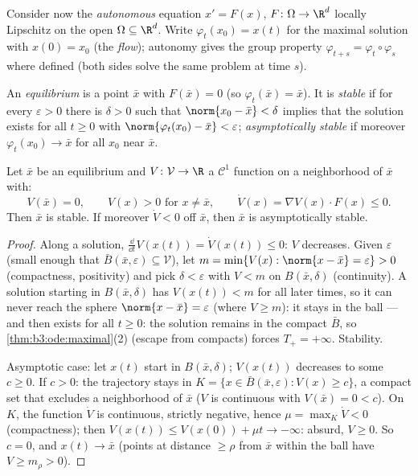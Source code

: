 Consider now the \emph{autonomous} equation $x' = F(x)$, $F
\colon \Omega \to \R^d$ locally Lipschitz on the open $\Omega
\subseteq \R^d$. Write $\varphi_t(x_0) = x(t)$ for the
maximal solution with $x(0) = x_0$ (the
\emph{flow}); autonomy gives
the group property $\varphi_{t+s} =
\varphi_t\circ\varphi_s$ where defined (both sides solve the
same problem at time $s$).

\begin{definition}\label{def:b3:ode:stability}
An \emph{equilibrium} is a point $\bar x$ with $F(\bar x) =
0$ (so $\varphi_t(\bar x) = \bar x$). It is
\emph{stable} if for every
$\varepsilon > 0$ there is $\delta > 0$ such that
$\norm{x_0 - \bar x} < \delta$ implies that the solution
exists for all $t \geq 0$ with $\norm{\varphi_t(x_0) - \bar
x} < \varepsilon$; \emph{asymptotically stable} if moreover
$\varphi_t(x_0) \to \bar x$ for all $x_0$ near $\bar x$.
\end{definition}

\begin{theorem}\label{thm:b3:ode:lyapunov}
Let $\bar x$ be an equilibrium and $V \colon \mathcal V \to
\R$ a $\mathcal C^1$ function on a neighborhood of $\bar x$
with:
\[
V(\bar x) = 0,\qquad V(x) > 0 \text{ for } x \neq \bar x,
\qquad \dot V(x) = \nabla V(x)\cdot F(x) \leq 0 .
\]
Then $\bar x$ is stable. If moreover $\dot V < 0 $ off $\bar
x$, then $\bar x$ is asymptotically stable.
\end{theorem}

\begin{proof}
Along a solution, $\frac{\dd}{\dd t}V(x(t)) = \dot V(x(t))
\leq 0$: $V$ decreases. Given $\varepsilon$ (small enough
that $\bar B(\bar x, \varepsilon) \subseteq \mathcal V$), let
$m = \min\{V(x) : \norm{x - \bar x} = \varepsilon\} > 0$
(compactness, positivity) and pick $\delta < \varepsilon$
with $V < m$ on $B(\bar x, \delta)$ (continuity). A solution
starting in $B(\bar x, \delta)$ has $V(x(t)) < m$ for all
later times, so it can never reach the sphere $\norm{x -
\bar x} = \varepsilon$ (where $V \geq m$): it stays in the
ball --- and then exists for all $t \geq 0$: the solution
remains in the compact $\bar B$, so
\cref{thm:b3:ode:maximal}(2) (escape from compacts) forces
$T_+ = +\infty$. Stability.

Asymptotic case: let $x(t)$ start in $B(\bar x, \delta)$;
$V(x(t))$ decreases to some $c \geq 0$. If $c > 0$: the
trajectory stays in $K = \{x \in \bar B(\bar x,
\varepsilon): V(x) \geq c\}$, a compact set that excludes a
neighborhood of $\bar x$ ($V$ is continuous with $V(\bar x)
= 0 < c$). On $K$, the function $\dot V$ is continuous,
strictly negative, hence $\mu = \max_K\dot V < 0$
(compactness); then $V(x(t)) \leq V(x(0)) + \mu t \to
-\infty$: absurd, $V \geq 0$. So
$c = 0$, and $x(t) \to \bar x$ (points at distance $\geq
\rho$ from $\bar x$ within the ball have $V \geq m_\rho >
0$).
\end{proof}

